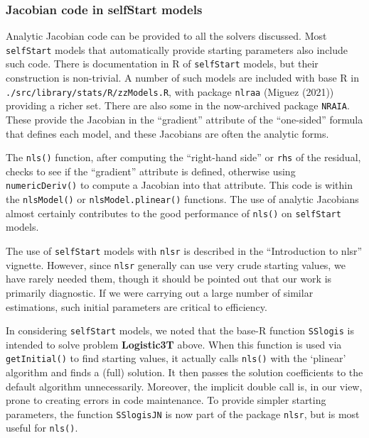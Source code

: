 \subsubsection{Jacobian code in selfStart models}\label{jacobian-code-in-selfstart-models}

Analytic Jacobian code can be provided to all the solvers discussed.
Most \texttt{selfStart} models that automatically provide starting parameters
also include such code. There is documentation in R
of \texttt{selfStart} models, but their construction is non-trivial. A number
of such models are included with base R in \texttt{./src/library/stats/R/zzModels.R},
with package \texttt{nlraa} (Miguez (2021)) providing a richer set.
There are also some in the now-archived package \texttt{NRAIA}.
These provide the Jacobian in the ``gradient'' attribute of the ``one-sided'' formula
that defines each model, and these Jacobians are often the analytic forms.

The \texttt{nls()} function, after
computing the ``right-hand side'' or \texttt{rhs} of the residual, checks to see if the
``gradient'' attribute is defined, otherwise using \texttt{numericDeriv()} to compute a
Jacobian into that attribute. This code is within the \texttt{nlsModel()} or
\texttt{nlsModel.plinear()} functions. The use of analytic Jacobians
almost certainly contributes to the good performance of \texttt{nls()} on \texttt{selfStart}
models.

The use of \texttt{selfStart} models with
\texttt{nlsr} is described in the ``Introduction to nlsr'' vignette. However, since \texttt{nlsr}
generally can use very crude starting values, we have rarely needed them, though
it should be pointed out that our work is primarily diagnostic. If we were carrying
out a large number of similar estimations, such initial parameters are
critical to efficiency.

In considering \texttt{selfStart} models, we noted that the base-R function \texttt{SSlogis}
is intended to solve problem \textbf{Logistic3T} above. When this function is used
via \texttt{getInitial()} to find
starting values, it actually calls \texttt{nls()} with the `plinear' algorithm
and finds a (full) solution. It then passes the solution coefficients to the default
algorithm unnecessarily. Moreover, the implicit double call is, in our view, prone to creating
errors in code maintenance.
To provide simpler starting parameters, the function \texttt{SSlogisJN}
is now part of the package \texttt{nlsr}, but is most useful for \texttt{nls()}.

